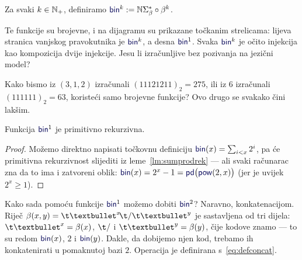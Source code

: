 \begin{definicija}[{name=[binarno kodiranje --- prateća funkcija binarne reprezentacije]}]\label{def:bink}
Za svaki $k\in{\mathbb N}_+$, definiramo $\f{bin}^k:=\N\Sigma_\beta^*\circ\beta^k$.
\end{definicija}

Te funkcije su brojevne, i na dijagramu su prikazane točkanim strelicama: lijeva stranica vanjskog pravokutnika je $\f{bin}^k$, a desna $\f{bin}^1$. Svaka $\f{bin}^k$ je očito injekcija kao kompozicija dvije injekcije. Jesu li izračunljive bez pozivanja na jezični model? %

Kako bismo iz $(3,1,2)$ izračunali $(11121211)_2=275$, ili iz $6$ izračunali $(111111)_2=63$, koristeći samo brojevne funkcije? Ovo drugo se svakako čini lakšim.

\begin{lema}[{name=[primitivna rekurzivnost jednomjesnog binarnog kodiranja]}]\label{lm:bin1prn}
Funkcija $\f{bin}^1$\! je primitivno rekurzivna.
\end{lema}
\begin{proof}
Možemo direktno napisati točkovnu definiciju $\f{bin}(x)=\sum_{i<x}2^i$, pa će primitivna rekurzivnost slijediti iz leme~\ref{lm:sumprodrek} --- ali svaki računarac zna da to ima i zatvoreni oblik:
$\f{bin}(x)=2^x-1=\f{pd}\bigl(\f{pow}(2,x)\bigr)$ (jer je uvijek $2^x\ge 1$).
\end{proof}

Kako sada pomoću funkcije $\f{bin}^1$ možemo dobiti $\f{bin}^2$? Naravno, konkatenacijom. Riječ $\beta(x,y)=\t\textbullet^x\!\t/\t\textbullet^y$ je sastavljena od tri dijela: $\t\textbullet^x=\beta(x)$, $\t/$ i $\t\textbullet^y=\beta(y)$, čije kodove znamo --- to su redom $\f{bin}(x)$, $2$ i $\f{bin}(y)$. Dakle, da dobijemo njen kod, trebamo ih konkatenirati u pomaknutoj bazi $2$. Operacija je definirana s~\eqref{eq:defconcat}.

